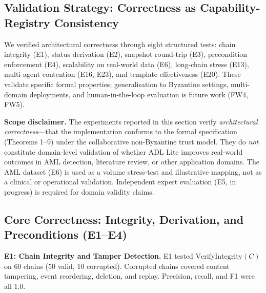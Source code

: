 
\subsection{Validation Strategy: Correctness as Capability-Registry Consistency}\label{subsec:validation-strategy}

We verified architectural correctness through eight structured tests: chain integrity (E1), status derivation (E2), snapshot round-trip (E3), precondition enforcement (E4), scalability on real-world data (E6), long-chain stress (E13), multi-agent contention (E16, E23), and template effectiveness (E20). These validate specific formal properties; generalisation to Byzantine settings, multi-domain deployments, and human-in-the-loop evaluation is future work (FW4, FW5).

\textbf{Scope disclaimer.} The experiments reported in this section verify \emph{architectural correctness}---that the implementation conforms to the formal specification (Theorems 1--9) under the collaborative non-Byzantine trust model. They do \emph{not} constitute domain-level validation of whether ADL Lite improves real-world outcomes in AML detection, literature review, or other application domains. The AML dataset (E6) is used as a volume stress-test and illustrative mapping, not as a clinical or operational validation. Independent expert evaluation (E5, in progress) is required for domain validity claims.

\subsection{Core Correctness: Integrity, Derivation, and Preconditions (E1--E4)}\label{subsec:core-correctness}

\textbf{E1: Chain Integrity and Tamper Detection.} \label{subsec:e1} E1 tested $\text{VerifyIntegrity}(C)$ on 60 chains (50 valid, 10 corrupted). Corrupted chains covered content tampering, event reordering, deletion, and replay. Precision, recall, and F1 were all 1.0.

